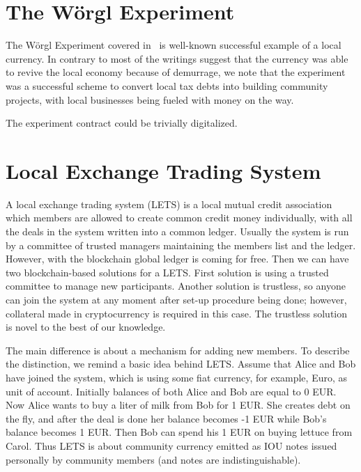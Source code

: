 \documentclass[]{llncs}   %
\begin{document}
\section{The W\"{o}rgl Experiment}
\label{sec-worgl}

The W\"{o}rgl Experiment covered in~\cite{muralt1934woergl} is well-known successful example of a local currency. In
contrary to most of the writings suggest that the currency was able to revive the local economy because of demurrage, we
 note that the experiment was a successful scheme to convert local tax debts into building community projects, with
 local businesses being fueled with money on the way.

The experiment contract could be trivially digitalized.

\section{Local Exchange Trading System}
\label{sec-lets}

A local exchange trading system (LETS)\cite{williams1996local} is a local mutual credit association which members are allowed to create common credit money individually, with all the deals in the system written into a common ledger. Usually the system is run by a committee of 
trusted managers maintaining the members list and the ledger. However, with the blockchain global ledger is coming for free. Then 
we can have two blockchain-based solutions for a LETS. First solution is using a trusted committee to manage new participants. Another 
solution is trustless, so anyone can join the system at any moment after set-up procedure being done; however, collateral made in cryptocurrency is required in this case. The trustless solution is novel to the best of our knowledge.

The main difference is about a mechanism for adding new members. To describe the distinction, we remind a basic idea behind LETS. Assume that Alice and Bob have joined the system, which is using some fiat currency, for example, Euro, as unit of account. Initially
balances of both Alice and Bob are equal to 0 EUR. Now Alice wants to buy a liter of milk from Bob for 1 EUR. She creates debt on the fly, and after the deal is done her balance becomes -1 EUR while Bob's balance becomes 1 EUR. Then Bob can spend his 1 EUR on buying lettuce from Carol. Thus LETS is about community currency emitted as IOU notes issued personally by community members (and notes are indistinguishable).
\end{document}
